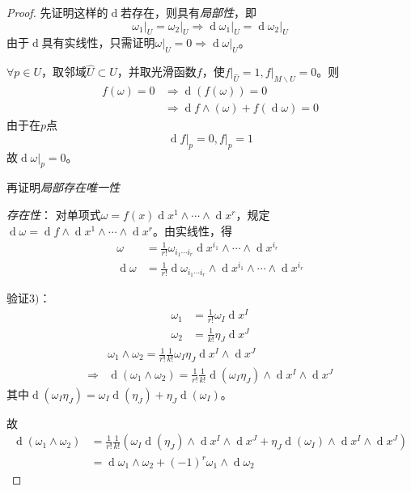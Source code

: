 \documentclass[winfonts,UTF8,c5size,a4paper,fancyhdr,hyperref,titlepage,nocap]{ctexart}
\theoremstyle{definition}
\theoremstyle{remark}
\numberwithin{equation}{subsection}
\newcommand{\dd}{\operatorname{d}}
\newcommand{\local}[2]{\left.{#1}\right|_{#2}}%
\newcommand{\localp}[1]{\local{#1}{p}}%
\begin{document}
\begin{proof}
  先证明这样的$\dd$若存在，则具有\emph{局部性}，即
\begin{equation*}
\local{\omega_1}{U}=\local{\omega_2}{U}\Longrightarrow\local{\dd\omega_1}{U}=\local{\dd\omega_2}{U}
\end{equation*}
由于$\dd$具有实线性，只需证明$\local{\omega}{U}=0\Rightarrow\local{\dd\omega}{U}$。

$\forall p\in U$，取邻域$\widehat{U}\subset U$，并取光滑函数$f$，使$\local{f}{\widehat{U}}=1, \local{f}{M\backslash U}=0$。则
\begin{align*}
f(\omega)=0&\Longrightarrow\dd(f(\omega))=0\\
                   &\Longrightarrow\dd f\wedge(\omega)+f(\dd\omega)=0
\end{align*}
由于在$p$点
\begin{equation*}
\localp{\dd f}=0, \localp{f}=1
\end{equation*}
故$\localp{\dd\omega}=0$。

再证明\emph{局部存在唯一性}

\emph{存在性}：
对单项式$\omega=f(x)\dd x^1\wedge\cdots\wedge\dd x^r$，规定$\dd\omega=\dd f\wedge\dd x^1\wedge\cdots\wedge\dd x^r$。由实线性，得
\begin{align*}
  \omega&=\frac{1}{r!}\omega_{i_1\cdots i_r}\dd x^{i_1}\wedge\cdots\wedge\dd x^{i_r}\\
  \dd\omega&=\frac{1}{r!}\dd\omega_{i_1\cdots i_r}\wedge\dd x^{i_1}\wedge\cdots\wedge\dd x^{i_r}
\end{align*}

验证$3)$：
\begin{align*}
  \omega_1&=\frac{1}{r!}\omega_I\dd x^I\\
  \omega_2&=\frac{1}{k!}\eta_J\dd x^J
\end{align*}
\begin{align*}
  &\omega_1\wedge\omega_2=\frac{1}{r!}\frac{1}{k!}\omega_I\eta_J\dd x^I\wedge\dd x^J\\
\Longrightarrow&\dd(\omega_1\wedge\omega_2)=\frac{1}{r!}\frac{1}{k!}\dd(\omega_I\eta_J)\wedge\dd x^I\wedge\dd x^J
\end{align*}
其中$\dd(\omega_I\eta_J)=\omega_I\dd(\eta_J)+\eta_J\dd(\omega_I)$。

故
\begin{align*}
\dd(\omega_1\wedge\omega_2)&=\frac{1}{r!}\frac{1}{k!}(\omega_I\dd(\eta_J)\wedge\dd x^I\wedge\dd x^J+\eta_J\dd(\omega_I)\wedge\dd x^I\wedge\dd x^J)\\
                           &=\dd\omega_1\wedge\omega_2+(-1)^r\omega_1\wedge\dd\omega_2
\end{align*}


\end{proof}
\end{document}
